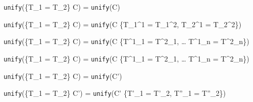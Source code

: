 \documentclass{article}
\begin{document}

    {\texttt{unify}(\{T_1 = T_2\} \cup C) = \texttt{unify}(C)}

    {\texttt{unify}(\{T_1 = T_2\} \cup C) = \texttt{unify}(C \cup \{T_1^1 = T_1^2, T_2^1 = T_2^2\})}

    {\texttt{unify}(\{T_1 = T_2\} \cup C) = \texttt{unify}(C \cup \{T^1_1 = T^2_1, \; \dots \; T^1_n = T^2_n\})}

    {\texttt{unify}(\{T_1 = T_2\} \cup C) = \texttt{unify}(C \cup \{T^1_1 = T^2_1, \; \dots \; T^1_n = T^2_n\})}

    {\texttt{unify}(\{T_1 = T_2\} \cup C) = \texttt{unify}(C')}

    {\texttt{unify}(\{T_1 = T_2\} \cup C') = \texttt{unify}(C' \cup \{T'_1 = T'_2, T''_1 = T''_2\})}
\end{document}

